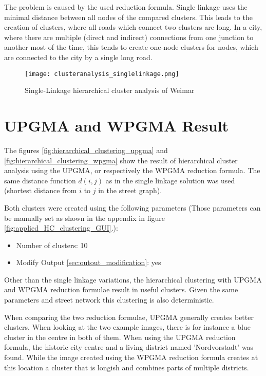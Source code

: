 The problem is caused by the used reduction formula. Single linkage uses the minimal distance between all nodes of the compared clusters. This leads to the creation of clusters, where all roads which connect two clusters are long. In a city, where there are multiple (direct and indirect) connections from one junction to another most of the time, this tends to create one-node clusters for nodes, which are connected to the city by a single long road.

\begin{figure}
    \centering
    \begin{mdframed}[style=mdthight, userdefinedwidth=0.7\textwidth, align=center]
        \texttt{[image: clusteranalysis\_singlelinkage.png]}
    \end{mdframed}
    \caption{Single-Linkage hierarchical cluster analysis of Weimar\label{fig:SingleLinkage}}
\end{figure}

\pagebreak
\section{UPGMA and WPGMA Result}
\label{sec:UPGMAandWPGMA}
The figures \ref{fig:hierarchical_clustering_upgma} and \ref{fig:hierarchical_clustering_wpgma} show the result of hierarchical cluster analysis using the \acrshort{UPGMA}, or respectively the \acrshort{WPGMA} reduction formula. The same distance function $d(i, j)$ as in the single linkage solution was used (shortest distance from $i$ to $j$ in the street graph).

Both clusters were created using the following parameters (Those parameters can be manually set as shown in the appendix in figure \ref{fig:applied_HC_clustering_GUI}.):

\begin{itemize}
    \item Number of clusters: 10
    \item Modify Output \ref{sec:outout_modification}: yes
\end{itemize}

Other than the single linkage variations, the hierarchical clustering with \acrshort{UPGMA} and \acrshort{WPGMA} reduction formulae result in useful clusters. Given the same parameters and street network this clustering is also deterministic.

When comparing the two reduction formulae, \acrshort{UPGMA} generally creates better clusters. When looking at the two example images, there is for instance a blue cluster in the centre in both of them. When using the \acrshort{UPGMA} reduction formula, the historic city centre and a living district named 'Nordvorstadt' was found. While the image created using the \acrshort{WPGMA} reduction formula creates at this location a cluster that is longish and combines parts of multiple districts.

